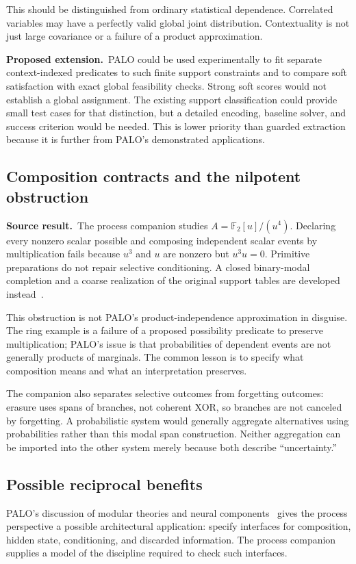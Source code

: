 \documentclass[11pt,a4paper]{article}
\theoremstyle{remark}
\newcommand{\F}{\mathbb F}
\newcommand{\sourceclaim}{\textbf{Source result.}\ }
\newcommand{\proposal}{\textbf{Proposed extension.}\ }
\begin{document}
This should be distinguished from ordinary statistical dependence. Correlated variables may have a perfectly valid global joint distribution. Contextuality is not just large covariance or a failure of a product approximation.

\proposal PALO could be used experimentally to fit separate context-indexed predicates to such finite support constraints and to compare soft satisfaction with exact global feasibility checks. Strong soft scores would not establish a global assignment. The existing support classification could provide small test cases for that distinction, but a detailed encoding, baseline solver, and success criterion would be needed. This is lower priority than guarded extraction because it is further from PALO's demonstrated applications.

\subsection{Composition contracts and the nilpotent obstruction}
\sourceclaim The process companion studies $A=\F_2[u]/(u^4)$. Declaring every nonzero scalar possible and composing independent scalar events by multiplication fails because $u^3$ and $u$ are nonzero but $u^3u=0$. Primitive preparations do not repair selective conditioning. A closed binary-modal completion and a coarse realization of the original support tables are developed instead~\cite[Sections 2--4]{process}.

This obstruction is not PALO's product-independence approximation in disguise. The ring example is a failure of a proposed possibility predicate to preserve multiplication; PALO's issue is that probabilities of dependent events are not generally products of marginals. The common lesson is to specify what composition means and what an interpretation preserves.

The companion also separates selective outcomes from forgetting outcomes: erasure uses spans of branches, not coherent XOR, so branches are not canceled by forgetting. A probabilistic system would generally aggregate alternatives using probabilities rather than this modal span construction. Neither aggregation can be imported into the other system merely because both describe ``uncertainty.''

\subsection{Possible reciprocal benefits}
PALO's discussion of modular theories and neural components~\cite[Section 5, pp.~47--48]{palo} gives the process perspective a possible architectural application: specify interfaces for composition, hidden state, conditioning, and discarded information. The process companion supplies a model of the discipline required to check such interfaces.
\end{document}
